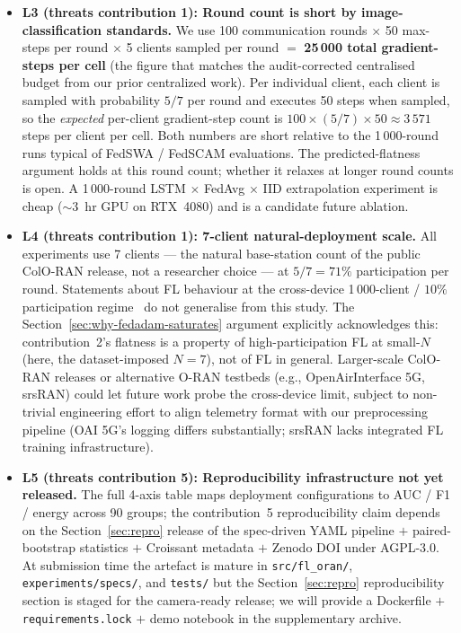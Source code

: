 \documentclass[journal]{IEEEtran}
\begin{document}
\begin{itemize}
  \item \textbf{L3 (threats contribution 1): Round count is short by image-classification standards.} We use 100 communication rounds $\times$ 50 max-steps per round $\times$ 5 clients sampled per round $=$ \textbf{25\,000 total gradient-steps per cell} (the figure that matches the audit-corrected centralised budget from our prior centralized work). Per individual client, each client is sampled with probability $5/7$ per round and executes 50 steps when sampled, so the \emph{expected} per-client gradient-step count is $100 \times (5/7) \times 50 \approx 3\,571$ steps per client per cell. Both numbers are short relative to the 1\,000-round runs typical of FedSWA / FedSCAM evaluations. The predicted-flatness argument holds at this round count; whether it relaxes at longer round counts is open. A 1\,000-round LSTM $\times$ FedAvg $\times$ IID extrapolation experiment is cheap ($\sim 3$~hr GPU on RTX~4080) and is a candidate future ablation.

  \item \textbf{L4 (threats contribution 1): 7-client natural-deployment scale.} All experiments use 7 clients --- the natural base-station count of the public ColO-RAN release, not a researcher choice --- at $5/7 = 71\%$ participation per round. Statements about FL behaviour at the cross-device 1\,000-client / $10\%$ participation regime~\cite{Hsu2019_Dirichlet} do not generalise from this study. The Section~\ref{sec:why-fedadam-saturates} argument explicitly acknowledges this: contribution~2's flatness is a property of high-participation FL at small-$N$ (here, the dataset-imposed $N = 7$), not of FL in general. Larger-scale ColO-RAN releases or alternative O-RAN testbeds (e.g., OpenAirInterface 5G, srsRAN) could let future work probe the cross-device limit, subject to non-trivial engineering effort to align telemetry format with our preprocessing pipeline (OAI 5G's logging differs substantially; srsRAN lacks integrated FL training infrastructure).

  \item \textbf{L5 (threats contribution 5): Reproducibility infrastructure not yet released.} The full 4-axis table maps deployment configurations to AUC / F1 / energy across 90 groups; the contribution~5 reproducibility claim depends on the Section~\ref{sec:repro} release of the spec-driven YAML pipeline $+$ paired-bootstrap statistics $+$ Croissant metadata $+$ Zenodo DOI under AGPL-3.0. At submission time the artefact is mature in \lstinline|src/fl_oran/|, \lstinline|experiments/specs/|, and \lstinline|tests/| but the Section~\ref{sec:repro} reproducibility section is staged for the camera-ready release; we will provide a Dockerfile $+$ \lstinline|requirements.lock| $+$ demo notebook in the supplementary archive.


\end{itemize}
\end{document}
